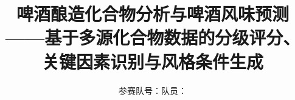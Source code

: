 \documentclass[UTF8,a4paper,12pt,fontset=fandol]{ctexart}
\begin{document}
\title{\bfseries 啤酒酿造化合物分析与啤酒风味预测\\[0.35em]
  \large ——基于多源化合物数据的分级评分、关键因素识别与风格条件生成}
\author{参赛队号：\underline{\hspace{2.5cm}}\quad 队员：\underline{\hspace{4.5cm}}}
\date{}
\maketitle
\thispagestyle{empty}



\newpage











\appendix

\end{document}
